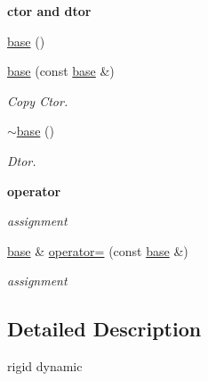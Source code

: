 \begin{Indent}{\bf ctor and dtor}\par
{\em \label{_amgrp98fbd3e5ae66fcd014fb744fec76c58d}
 }\begin{DoxyCompactItemize}
\item 
\hyperlink{classnebula_1_1content_1_1actor_1_1physics_1_1physx_1_1base_aafdc45638786e07d5c5203a1cf164ede}{base} ()
\item 
\hyperlink{classnebula_1_1content_1_1actor_1_1physics_1_1physx_1_1base_af2dec08c2a0fb1a1939ce465f5c96ee5}{base} (const \hyperlink{classnebula_1_1content_1_1actor_1_1physics_1_1physx_1_1base}{base} \&)
\begin{DoxyCompactList}\small\item\em Copy Ctor. \item\end{DoxyCompactList}\item 
\hyperlink{classnebula_1_1content_1_1actor_1_1physics_1_1physx_1_1base_a7753937c9eae2a2fa5a77c349986067c}{$\sim$base} ()
\begin{DoxyCompactList}\small\item\em Dtor. \item\end{DoxyCompactList}\end{DoxyCompactItemize}
\end{Indent}
\begin{Indent}{\bf operator}\par
{\em \label{_amgrp4b583376b2767b923c3e1da60d10de59}
 assignment }\begin{DoxyCompactItemize}
\item 
\hyperlink{classnebula_1_1content_1_1actor_1_1physics_1_1physx_1_1base}{base} \& \hyperlink{classnebula_1_1content_1_1actor_1_1physics_1_1physx_1_1base_a0e06604de753b8803bf4364ab967d23d}{operator=} (const \hyperlink{classnebula_1_1content_1_1actor_1_1physics_1_1physx_1_1base}{base} \&)
\begin{DoxyCompactList}\small\item\em assignment \item\end{DoxyCompactList}\end{DoxyCompactItemize}
\end{Indent}


\subsection{Detailed Description}
rigid dynamic 

